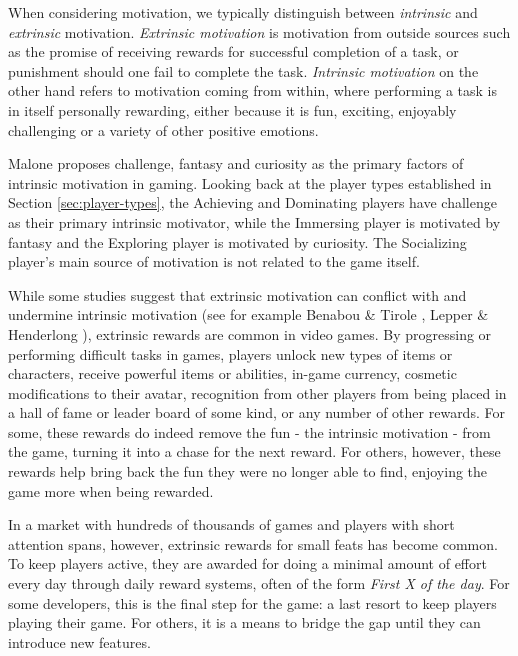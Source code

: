 When considering motivation, we typically distinguish between \emph{intrinsic} and \emph{extrinsic} motivation. \emph{Extrinsic motivation} is motivation from outside sources such as the promise of receiving rewards for successful completion of a task, or punishment should one fail to complete the task. \emph{Intrinsic motivation} on the other hand refers to motivation coming from within, where performing a task is in itself personally rewarding, either because it is fun, exciting, enjoyably challenging or a variety of other positive emotions.

Malone \cite{malone1981toward} proposes challenge, fantasy and curiosity as the primary factors of intrinsic motivation in gaming. Looking back at the player types established in Section \ref{sec:player-types}, the Achieving and Dominating players have challenge as their primary intrinsic motivator, while the Immersing player is motivated by fantasy and the Exploring player is motivated by curiosity. The Socializing player's main source of motivation is not related to the game itself.

While some studies suggest that extrinsic motivation can conflict with and undermine intrinsic motivation (see for example Benabou \& Tirole \cite{benabou2003intrinsic}, Lepper \& Henderlong \cite{lepper2000motivation}), extrinsic rewards are common in video games. By progressing or performing difficult tasks in games, players unlock new types of items or characters, receive powerful items or abilities, in-game currency, cosmetic modifications to their avatar, recognition from other players from being placed in a hall of fame or leader board of some kind, or any number of other rewards. For some, these rewards do indeed remove the fun - the intrinsic motivation - from the game, turning it into a chase for the next reward. For others, however, these rewards help bring back the fun they were no longer able to find, enjoying the game more when being rewarded.

In a market with hundreds of thousands of games and players with short attention spans, however, extrinsic rewards for small feats has become common. To keep players active, they are awarded for doing a minimal amount of effort every day through daily reward systems, often of the form \emph{First X of the day}. For some developers, this is the final step for the game: a last resort to keep players playing their game. For others, it is a means to bridge the gap until they can introduce new features.


